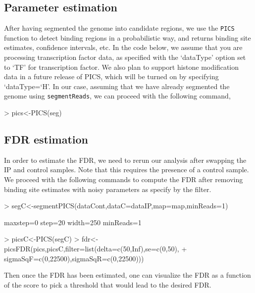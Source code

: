 \documentclass[a4paper]{article}
\begin{document}
\subsection{Parameter estimation}
After having segmented the genome into candidate regions, we use the \texttt{PICS} function to detect binding regions in a probabilistic way, and returns binding site estimates, confidence intervals, etc. In the code below, we assume that you are processing transcription factor data, as specified with the `dataType' option set to `TF' for transcription factor. We also plan to support histone modification data in a future release of PICS, which will be turned on by specifying `dataType=`H'. In our case, assuming that we have already segmented the genome using \texttt{segmentReads}, we can proceed with the following command, 

\begin{Schunk}
\begin{Sinput}
> pics<-PICS(seg)
\end{Sinput}
\end{Schunk}

\subsection{FDR estimation}
In order to estimate the FDR, we need to rerun our analysis after swapping the IP and control samples. Note that this requires the presence of a control sample. We proceed with the following commands to compute the FDR after removing binding site estimates with noisy parameters as specify by the filter. 

\begin{Schunk}
\begin{Sinput}
> segC<-segmentPICS(dataCont,dataC=dataIP,map=map,minReads=1)
\end{Sinput}
\begin{Soutput}
maxstep=0
step=20
width=250
minReads=1
\end{Soutput}
\begin{Sinput}
> picsC<-PICS(segC)
> fdr<-picsFDR(pics,picsC,filter=list(delta=c(50,Inf),se=c(0,50),
+ sigmaSqF=c(0,22500),sigmaSqR=c(0,22500)))
\end{Sinput}
\end{Schunk}

Then once the FDR has been estimated, one can visualize the FDR as a function of the score to pick a threshold that would lead to the desired FDR. 
\end{document}
